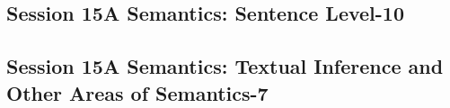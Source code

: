\subsection{\large Session 15A Semantics: Sentence Level-10}
\label{parallel-session-15A-trackF}
\TrackFLoc\hfill\sessionchair{}{}
\clearpage
\subsection{\large Session 15A Semantics: Textual Inference and Other Areas of Semantics-7}
\label{parallel-session-15A-trackG}
\TrackGLoc\hfill\sessionchair{}{}
\clearpage



